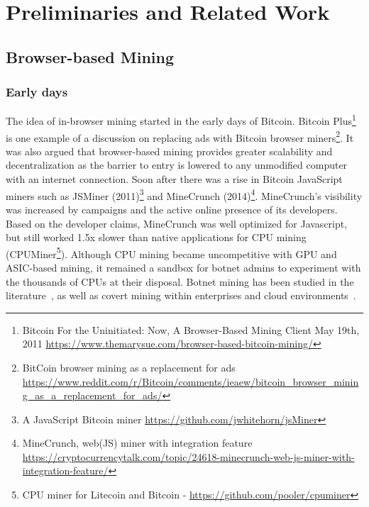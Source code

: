 %
%
%
%
%
%

\section{Preliminaries and Related Work}

\subsection{Browser-based Mining}

\subsubsection{Early days}
The idea of in-browser mining started in the early days of Bitcoin. Bitcoin Plus\footnote{Bitcoin For the Uninitiated: Now, A Browser-Based Mining Client  May 19th, 2011 \url{https://www.themarysue.com/browser-based-bitcoin-mining/}} is one example of a discussion on replacing ads with Bitcoin browser miners\footnote{BitCoin browser mining as a replacement for ads \url{https://www.reddit.com/r/Bitcoin/comments/ieaew/bitcoin_browser_mining_as_a_replacement_for_ads/}}. It was also argued that browser-based mining provides greater scalability and decentralization as the barrier to entry is lowered to any unmodified computer with an internet connection. Soon after there was a rise in Bitcoin JavaScript miners such as JSMiner (2011)\footnote{A JavaScript Bitcoin miner \url{https://github.com/jwhitehorn/jsMiner}} and MineCrunch (2014)\footnote{MineCrunch, web(JS) miner with integration feature \url{https://cryptocurrencytalk.com/topic/24618-minecrunch-web-js-miner-with-integration-feature/}}. MineCrunch's visibility was increased by campaigns and the active online presence of its developers. Based on the developer claims, MineCrunch was well optimized for Javascript, but still worked 1.5x slower than native applications for CPU mining (\eg CPUMiner\footnote{CPU miner for Litecoin and Bitcoin - \url{https://github.com/pooler/cpuminer}}). Although CPU mining became uncompetitive with GPU and ASIC-based mining, it remained a sandbox for botnet admins to experiment with the thousands of CPUs at their disposal. Botnet mining has been studied in the literature~\cite{huang2014botcoin,wyke2012zeroaccess}, as well as covert mining within enterprises and cloud environments~\cite{MiningonSOeDime2017}.

